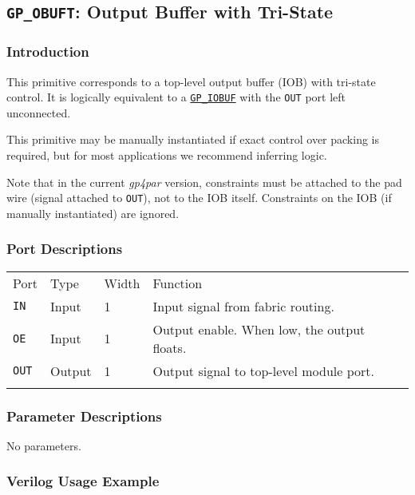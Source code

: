 \documentclass[11pt]{article}
\newcommand{\namestyle}[1]{\textit{#1}}
\newcommand{\tokenstyle}[1]{\texttt{#1}}
\newcommand{\whenstyle}[1]{{\fontseries{sb}\selectfont#1}}
\newcommand{\tokenref}[2]{\hyperref[#2]{\tokenstyle{#1}}}
\newcommand{\thinhline}{\Xhline{1\arrayrulewidth}}
\newcommand{\thickhline}{\Xhline{2.5\arrayrulewidth}}
\begin{document}

\pagebreak
\subsection{\tokenstyle{GP\_OBUFT}: Output Buffer with Tri-State}
\label{gp-obuft}

\subsubsection{Introduction}
This primitive corresponds to a top-level output buffer (IOB) with tri-state control. It is logically equivalent to a
\tokenref{GP\_IOBUF}{gp-iobuf} with the \tokenstyle{OUT} port left unconnected.

This primitive may be manually instantiated if exact control over packing is required, but for most applications we
recommend inferring logic.

Note that in the current \namestyle{gp4par} version, constraints must be attached to the pad wire (signal attached to \tokenstyle{OUT}), not to the IOB itself. Constraints on the IOB (if manually instantiated) are ignored.

\subsubsection{Port Descriptions}

\begin{tabularx}{\textwidth}{lllX}
\thinhline
\whenstyle{Port} & \whenstyle{Type} & \whenstyle{Width} & \whenstyle{Function} \\
\thickhline
\tokenstyle{IN} & Input & 1 & Input signal from fabric routing. \\
\thinhline
\tokenstyle{OE} & Input & 1 & Output enable. When low, the output floats. \\
\thinhline
\tokenstyle{OUT} & Output & 1 & Output signal to top-level module port. \\
\thinhline
\end{tabularx}

\subsubsection{Parameter Descriptions}

No parameters.

\subsubsection{Verilog Usage Example}
\end{document}
